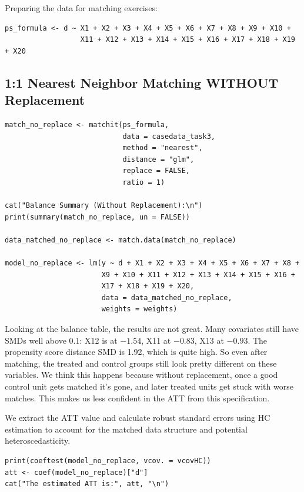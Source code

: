 \documentclass[12pt,a4paper]{article}
\begin{document}
Preparing the data for matching exercises:

\begin{lstlisting}
ps_formula <- d ~ X1 + X2 + X3 + X4 + X5 + X6 + X7 + X8 + X9 + X10 +
                  X11 + X12 + X13 + X14 + X15 + X16 + X17 + X18 + X19 + X20
\end{lstlisting}

\subsection{1:1 Nearest Neighbor Matching WITHOUT Replacement}

\begin{lstlisting}
match_no_replace <- matchit(ps_formula,
                            data = casedata_task3,
                            method = "nearest",
                            distance = "glm",
                            replace = FALSE,
                            ratio = 1)

cat("Balance Summary (Without Replacement):\n")
print(summary(match_no_replace, un = FALSE))

data_matched_no_replace <- match.data(match_no_replace)

model_no_replace <- lm(y ~ d + X1 + X2 + X3 + X4 + X5 + X6 + X7 + X8 +
                       X9 + X10 + X11 + X12 + X13 + X14 + X15 + X16 +
                       X17 + X18 + X19 + X20,
                       data = data_matched_no_replace,
                       weights = weights)
\end{lstlisting}

Looking at the balance table, the results are not great. Many covariates still have SMDs well above 0.1: X12 is at $-1.54$, X11 at $-0.83$, X13 at $-0.93$. The propensity score distance SMD is 1.92, which is quite high. So even after matching, the treated and control groups still look pretty different on these variables. We think this happens because without replacement, once a good control unit gets matched it's gone, and later treated units get stuck with worse matches. This makes us less confident in the ATT from this specification.

We extract the ATT value and calculate robust standard errors using HC estimation to account for the matched data structure and potential heteroscedasticity.

\begin{lstlisting}
print(coeftest(model_no_replace, vcov. = vcovHC))
att <- coef(model_no_replace)["d"]
cat("The estimated ATT is:", att, "\n")
\end{lstlisting}
\end{document}
